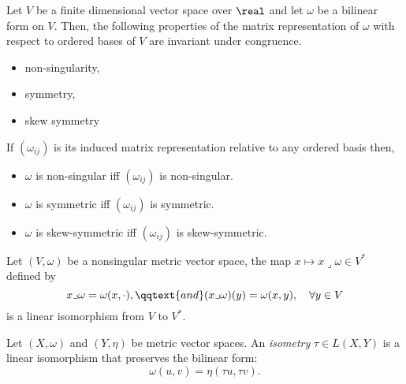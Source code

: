 \documentclass[../main-v2-manifolds.tex]{subfiles}
\begin{document}
    \begin{lemma}\label{lem:characterisation of bilinear forms}
        Let $V$ be a finite dimensional vector space over $\real$ and let $\omega$ be a bilinear form on $V$. Then, the following properties of the matrix representation of $\omega$ with respect to ordered bases of $V$ are invariant under congruence.
        \begin{itemize}
            \item non-singularity,
            \item symmetry,
            \item skew symmetry
        \end{itemize}
        If $(\omega_{ij})$ is its induced matrix representation relative to any ordered basis then,
        \begin{itemize}
            \item $\omega$ is non-singular iff $(\omega_{ij})$ is non-singular.
           \item $\omega$ is symmetric iff $(\omega_{ij})$ is symmetric.
           \item $\omega$ is skew-symmetric iff $(\omega_{ij})$ is skew-symmetric.
        \end{itemize}
   \end{lemma}     
    
    \begin{wts}\label{eq:Riesz Representation MVS}
        Let $(V,\omega)$ be a nonsingular metric vector space, the map $x\mapsto x\lrcorner \omega\in V^*$ defined by
        \[
            x\lrcorner\omega = \omega(x,\cdot),\qqtext{and}(x\lrcorner\omega)(y) = \omega(x,y),\quad\forall y\in V
        \]
        is a linear isomorphism from $V$ to $V^*$. 
    \end{wts}

    \begin{definition}
    Let $(X,\omega)$ and $(Y, \eta)$ be metric vector spaces. An \emph{isometry} $\tau\in L(X,Y)$ is a linear isomorphism that preserves the bilinear form:
    \[
        \omega(u,v) = \eta(\tau u, \tau v).
    \]    
    \end{definition}
    
\end{document}
